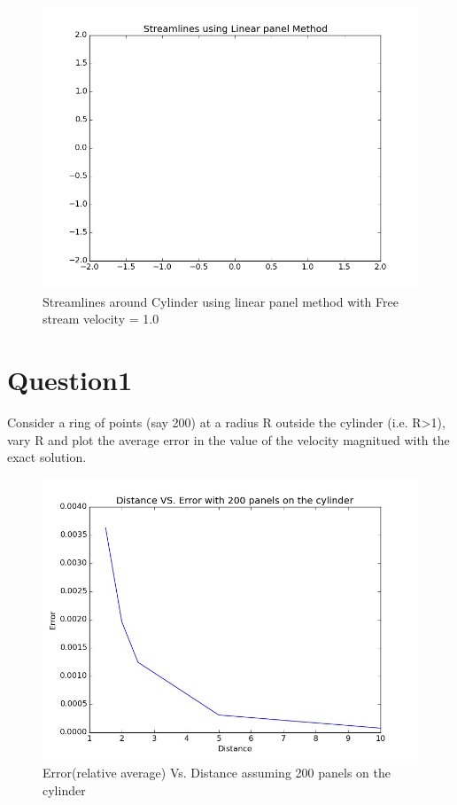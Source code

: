 \documentclass{article}
\begin{document}
\begin{figure}[H] \label{figure}
\includegraphics[width=12cm]{streamlines.png}
\caption{Streamlines around Cylinder using linear panel method with Free stream velocity = 1.0}
\label{figure:}
\end{figure}

\newpage
\section*{Question1}
Consider a ring of points (say 200) at a radius R outside the cylinder (i.e. R>1), vary R and plot the average error in the value of the velocity magnitued with the exact solution.

\begin{figure}[H]  \label{figure}
\includegraphics[width=12cm]{result1.jpg}
\caption{Error(relative average) Vs. Distance assuming 200 panels on the cylinder}
\label{figure:}
\end{figure}
\end{document}
